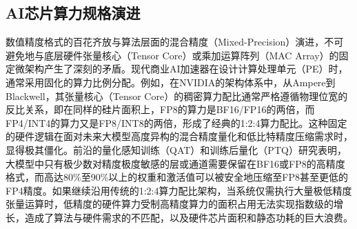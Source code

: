 \documentclass[10.5pt,compsoc,UTF8]{CjC}
\theoremstyle{mystyle}
\begin{document}
\subsection{AI芯片算力规格演进}
数值精度格式的百花齐放与算法层面的混合精度（Mixed-Precision）演进，不可避免地与底层硬件张量核心（Tensor Core）或乘加运算阵列（MAC Array）的固定微架构产生了深刻的矛盾。现代商业AI加速器在设计计算处理单元（PE）时，通常采用固化的算力比例分配。例如，在NVIDIA的架构体系中，从Ampere\cite{nvidia2020ampere}到Blackwell\cite{nvidia2024blackwell}，其张量核心（Tensor Core）的稠密算力配比通常严格遵循物理位宽的反比关系，即在同样的硅片面积上，FP8的算力是BF16/FP16的两倍，而FP4/INT4的算力又是FP8/INT8的两倍，形成了经典的1:2:4算力配比。这种固定的硬件逻辑在面对未来大模型高度异构的混合精度量化和低比特精度压缩需求时，显得极其僵化。前沿的量化感知训练\cite{int8quant}（QAT）和训练后量化\cite{lin2024awq,frantar2022gptq}（PTQ）研究表明，大模型中只有极少数对精度极度敏感的层或通道需要保留在BF16或FP8的高精度格式，而高达80\%至90\%以上的权重和激活值可以被安全地压缩至FP8甚至更低的FP4精度。如果继续沿用传统的1:2:4算力配比架构，当系统仅需执行大量极低精度张量运算时，低精度的硬件算力受制高精度算力的面积占用无法实现指数级的增长，造成了算法与硬件需求的不匹配，以及硬件芯片面积和静态功耗的巨大浪费。
\end{document}

